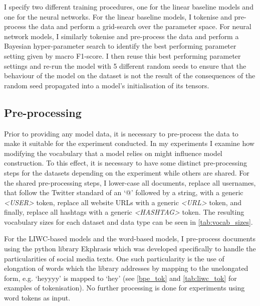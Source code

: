 I specify two different training procedures, one for the linear baseline models and one for the neural networks.
For the linear baseline models, I tokenise and pre-process the data and perform a grid-search over the parameter space.
For neural network models, I similarly tokenise and pre-process the data and perform a Bayesian hyper-parameter search to identify the best performing parameter setting given by macro F1-score. I then reuse this best performing parameter settings and re-run the model with 5 different random seeds to ensure that the behaviour of the model on the dataset is not the result of the consequences of the random seed propagated into a model's initialisation of its tensors.

\subsection{Pre-processing}

Prior to providing any model data, it is necessary to pre-process the data to make it suitable for the experiment conducted. In my experiments I examine how modifying the vocabulary that a model relies on might influence model construction. To this effect, it is necessary to have some distinct pre-processing steps for the datasets depending on the experiment while others are shared. For the shared pre-processing steps, I lower-case all documents, replace all usernames, that follow the Twitter standard of an `@' followed by a string, with a generic \textit{<USER>} token, replace all website URLs with a generic \textit{<URL>} token, and finally, replace all hashtags with a generic \textit{<HASHTAG>} token. The resulting vocabulary sizes for each dataset and data type can be seen in \cref{tab:vocab_sizes}.

For the LIWC-based models and the word-based models, I pre-process documents using the python library Ekphrasis \citep{baziotis:2017} which was developed specifically to handle the particularities of social media texts. One such particularity is the use of elongation of words which the library addresses by mapping to the unelongated form, e.g. `heyyyy' is mapped to `hey' (see \cref{bpe_tok} and \cref{tab:liwc_tok} for examples of tokenisation). No further processing is done for experiments using word tokens as input.

